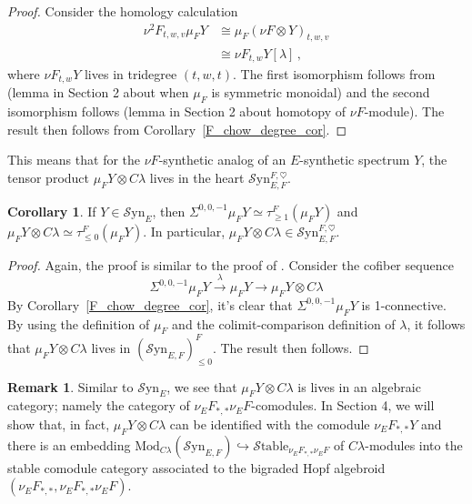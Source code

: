 \documentclass[10pt]{amsart}
\theoremstyle{definition}
\numberwithin{figure}{section}
\numberwithin{equation}{section}
\newtheorem{corollary}[figure]{Corollary}
\newtheorem{remark}[figure]{Remark}
\theoremstyle{cited}
\newcommand{\Mod}{\mathrm{Mod}}
\newcommand{\Syn}{\mathcal{S}\mathrm{yn}}
\newcommand{\Stable}{\mathcal{S}\mathrm{table}}
\begin{document}
  \begin{proof}
      Consider the homology calculation
  \begin{equation*}
      \begin{aligned}
          \nu^2F_{t,w,v}\mu_FY &\cong \mu_F(\nu F\otimes Y)_{t,w,v} \\
          &\cong \nu F_{t,w} Y[\lambda]\, ,
      \end{aligned}
  \end{equation*}
  where $\nu F_{t,w} Y$ lives in tridegree $(t,w,t)$. The first isomorphism follows from (lemma in Section 2 about when $\mu_F$ is symmetric monoidal) and the second isomorphism follows (lemma in Section 2 about homotopy of $\nu F$-module). The result then follows from Corollary~\ref{F_chow_degree_cor}.
  \end{proof}
  
  This means that for the $\nu F$-synthetic analog of an $E$-synthetic spectrum $Y$, the tensor product $\mu_FY\otimes C\lambda$ lives in the heart $\Syn_{E,F}^{F,\heartsuit}$.
  
  \begin{corollary}
  If $Y\in\Syn_E$, then $\Sigma^{0,0,-1}\mu_FY\simeq \tau_{\geq 1}^F(\mu_FY)$ and $\mu_F Y\otimes C\lambda\simeq \tau_{\leq 0}^F(\mu_FY)$. In particular, $\mu_FY\otimes C\lambda\in \Syn_{E,F}^{F,\heartsuit}$.  
  \end{corollary}
  
  \begin{proof}
     Again, the proof is similar to the proof of \cite[Lemma 4.29]{Pst22}. Consider the cofiber sequence
     $$
  \Sigma^{0,0,-1}\mu_FY\xrightarrow{\lambda}\mu_FY\to \mu_FY\otimes C\lambda
     $$
     By Corollary~\ref{F_chow_degree_cor}, it's clear that $\Sigma^{0,0,-1}\mu_FY$ is 1-connective. By using the definition of $\mu_F$ and the colimit-comparison definition of $\lambda$, it follows that $\mu_FY\otimes C\lambda$ lives in $(\Syn_{E,F})_{\leq 0}^F$. The result then follows.
  \end{proof}
  
  \begin{remark}
  Similar to $\Syn_E$, we see that $\mu_FY\otimes C\lambda$ is lives in an algebraic category; namely the category of $\nu_EF_{*,*}\nu_E F$-comodules. In Section 4, we will show that, in fact, $\mu_FY\otimes C\lambda$ can be identified with the comodule $\nu_{E}F_{*,*}Y$ and there is an embedding $\Mod_{C\lambda}(\Syn_{E,F})\hookrightarrow \Stable_{\nu_EF_{*,*}\nu_EF}$ of $C\lambda$-modules into the stable comodule category associated to the bigraded Hopf algebroid $(\nu_EF_{*,*},\nu_EF_{*,*}\nu_EF)$.    
  \end{remark}
\end{document}
